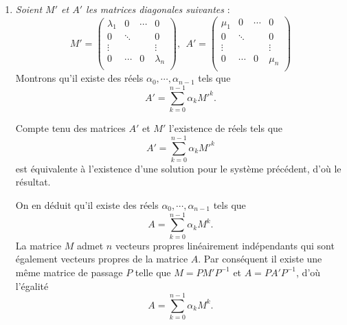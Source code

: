 {{\begin {enumerate}
\begin {enumerate}
Ce d\'eterminant est le d\'eterminant du syst\`eme suivant, 
$$\left\{\begin{align*}\mu_1&=\alpha_0+\alpha_1\lambda_1+\cdots+\alpha_{n-1}\lambda_1^{n-1} \\ 
\vdots \\  \mu_n &=\alpha_0+\alpha_1\lambda_n+\cdots+\alpha_{n-1}\lambda_n^{n-1} \\ \end{align*} \right.$$
or $V(\lambda_1,\cdots,\lambda_n)\neq0$ puisque les $\lambda_i$ sont suppos\'es distincts, c'est donc un syst\`eme de Cramer, il admet donc une unique solution $(\alpha_0,\cdots,\alpha_{n-1})\in\R^n.$
    \item {\it Soient $M'$ et $A'$ les matrices diagonales suivantes} :
$$M'=\begin{pmatrix}
\lambda_1 & 0 &\cdots & 0 \\  
0 &\ddots  & & 0 \\ \vdots & &  & \vdots \\  
0 & \cdots & 0 &\lambda_n \\ 
\end{pmatrix},\ \ 
A'=\begin{pmatrix}
\mu_1 & 0 &\cdots & 0 \\  
0 &\ddots  & & 0 \\
\vdots & &  & \vdots \\  
0 & \cdots & 0 &\mu_n \\ 
\end{pmatrix}$$
Montrons qu'il existe des r\'eels $\alpha_0,\cdots,\alpha_{n-1}$ tels que
$$A'=\sum_{k=0}^{n-1}\alpha_k M'^k.$$

Compte tenu des matrices $A'$ et $M'$ l'existence de r\'eels tels que $$A'=\sum_{k=0}^{n-1}\alpha_k M'^k$$ est \'equivalente \`a l'existence d'une solution pour le syst\`eme pr\'ec\'edent, d'o\`u le r\'esultat.

On en d\'eduit qu'il existe des r\'eels $\alpha_0,\cdots,\alpha_{n-1}$ tels que
$$A=\sum_{k=0}^{n-1}\alpha_k M^k.$$ 
La matrice $M$ admet $n$ vecteurs propres lin\'eairement ind\'ependants qui sont \'egalement vecteurs propres de la matrice $A$. Par cons\'equent il existe une m\^eme matrice de passage $P$ telle que $M=PM'P^{-1}$ et $A=PA'P^{-1}$, d'o\`u l'\'egalit\'e 
$$A=\sum_{k=0}^{n-1}\alpha_k M^k.$$   
  \end {enumerate}
\end {enumerate}}
}